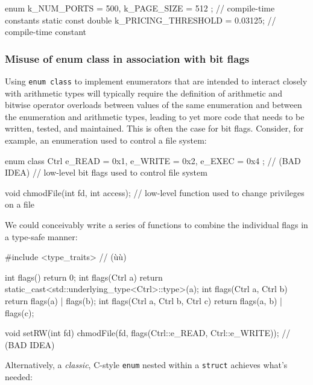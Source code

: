 \begin{emcppslisting}[basicstyle={\ttfamily\footnotesize}]
enum { k_NUM_PORTS = 500, k_PAGE_SIZE = 512 };     // compile-time constants
static const double k_PRICING_THRESHOLD = 0.03125; // compile-time constant
\end{emcppslisting}

\subsubsection[Misuse of {\tt enum} {\tt class} in association with bit flags]{Misuse of {\SubsubsecCode enum} {\SubsubsecCode class} in association with bit flags}\label{misuse-of-enum-class-in-association-with-bit-flags}

Using \texttt{enum}~\texttt{class} to implement enumerators that are
intended to interact closely with arithmetic types will typically
require the definition of arithmetic and bitwise operator overloads
between values of the same enumeration and between the enumeration and
arithmetic types, leading to yet more code that needs to be written,
tested, and maintained. This is often the case for bit flags. Consider, for example, an
enumeration used to control a file system:

\begin{emcppslisting}[emcppsbatch=e14]
enum class Ctrl { e_READ = 0x1, e_WRITE = 0x2, e_EXEC = 0x4 };  // (BAD IDEA)
    // low-level bit flags used to control file system

void chmodFile(int fd, int access);
    // low-level function used to change privileges on a file
\end{emcppslisting}

\noindent We could conceivably write a series of functions to combine the
individual flags in a type-safe manner:

\begin{emcppslisting}[emcppsbatch=e14]
#include <type_traits>  // (ù{}ù)

int flags() { return 0; }
int flags(Ctrl a) { return static_cast<std::underlying_type<Ctrl>::type>(a); }
int flags(Ctrl a, Ctrl b) { return flags(a) | flags(b); }
int flags(Ctrl a, Ctrl b, Ctrl c) { return flags(a, b) | flags(c); }

void setRW(int fd)
{
    chmodFile(fd, flags(Ctrl::e_READ, Ctrl::e_WRITE));  // (BAD IDEA)
}
\end{emcppslisting}

\noindent Alternatively, a \emph{classic}, C-style \texttt{enum} nested within a
\texttt{struct} achieves what's needed:

